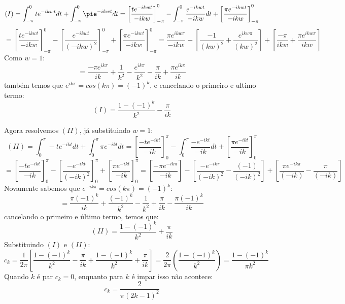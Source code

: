 \begin{equation*}
    (I) = \int_{-\pi}^0 te^{-ikwt}dt + \int_{-\pi}^0 \pie^{-ikwt}dt = \left[\frac{te^{-ikwt}}{-ikw}\right]_{-\pi}^0 - \int_{-\pi}^0 \frac{e^{-ikwt}}{-ikw}dt+ \left[\frac{\pi e^{-ikwt}}{-ikw}\right]_{-\pi}^0
\end{equation*}
\begin{equation*}
    = \left[\frac{te^{-ikwt}}{-ikw}\right]_{-\pi}^0 - \left[\frac{e^{-ikwt}}{(-ikw)^2}\right]_{-\pi}^0 + \left[\frac{\pi e^{-ikwt}}{-ikw}\right]_{-\pi}^0 = \frac{\pi e^{ikw\pi}}{-ikw} - \left[\frac{-1}{(kw)^2} + \frac{e^{ikw\pi}}{(kw)^2}\right]+\left[\frac{-\pi}{ikw} + \frac{\pi e^{ikw\pi}}{ikw}\right]
\end{equation*}
Como $w=1$:
\begin{equation*}
    =\frac{-\pi e^{ik\pi}}{ik} + \frac{1}{k^2} - \frac{e^{ik\pi}}{k^2} - \frac{\pi}{ik} + \frac{\pi e^{ik\pi}}{ik}
\end{equation*}
também temos que $e^{ik\pi} = cos(k\pi) = (-1)^k$, e cancelando o primeiro e ultimo termo:
\begin{equation*}
    (I) = \frac{1-(-1)^k}{k^2} - \frac{\pi}{ik}
\end{equation*}

Agora resolvemos $(II)$, já substituindo $w=1$:
\begin{equation*}
    (II) = \int^\pi_0 -te^{-ikt}dt + \int^\pi_0 \pi e^{-ikt}dt = \left[\frac{-te^{-ikt}}{-ik}\right]^\pi_0 - \int^\pi_0 \frac{-e^{-ikt}}{-ik}dt + \left[\frac{\pi e^{-ikt}}{-ik}\right]^\pi_0
\end{equation*}
\begin{equation*}
    = \left[\frac{-te^{-ikt}}{-ik}\right]^\pi_0 - \left[\frac{-e^{-ikt}}{(-ik)^2} \right]^\pi_0 + \left[\frac{\pi e^{-ikt}}{-ik}\right]^\pi_0 =  \left[\frac{-\pi e^{-ik\pi}}{-ik}\right] - \left[\frac{-e^{-ik\pi}}{(-ik)^2} - \frac{(-1)}{(-ik)^2}\right] + \left[\frac{\pi e^{-ik\pi}}{(-ik)} - \frac{\pi}{(-ik)}\right]
\end{equation*}
Novamente sabemos que $e^{-ik\pi} = cos(k\pi) = (-1)^k$:
\begin{equation*}
    =\frac{\pi(-1)^k}{ik} + \frac{(-1)^k}{k^2} -\frac{1}{k^2}  + \frac{\pi}{ik} - \frac{\pi(-1)^k}{ik}
\end{equation*}
cancelando o primeiro e último termo, temos que:
\begin{equation*}
    (II) = \frac{1 - (-1)^k}{k^2} + \frac{\pi}{ik}
\end{equation*}
Substituindo $(I)$ e $(II)$:
\begin{equation*}
    c_k = \frac{1}{2\pi}\left[\frac{1-(-1)^k}{k^2} - \frac{\pi}{ik} +\frac{1 - (-1)^k}{k^2} + \frac{\pi}{ik}\right] = \frac{2}{2\pi}\left(\frac{1-(-1)^k}{k^2} \right) = \frac{1-(-1)^k}{\pi k^2}
\end{equation*}
Quando $k$ é par $c_k = 0$, enquanto para $k$ é impar isso não acontece:
\begin{equation*}
    c_k = \frac{2}{\pi(2k-1)^2}
\end{equation*}


